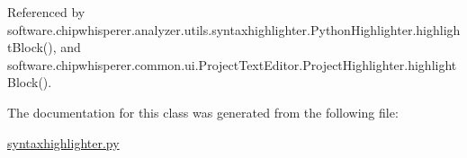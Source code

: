 Referenced by software.\+chipwhisperer.\+analyzer.\+utils.\+syntaxhighlighter.\+Python\+Highlighter.\+highlight\+Block(), and software.\+chipwhisperer.\+common.\+ui.\+Project\+Text\+Editor.\+Project\+Highlighter.\+highlight\+Block().



The documentation for this class was generated from the following file\+:\begin{DoxyCompactItemize}
\item 
\hyperlink{syntaxhighlighter_8py}{syntaxhighlighter.\+py}\end{DoxyCompactItemize}
